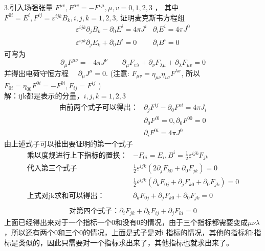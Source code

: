 \documentclass[UTF8]{ctexart}
\begin{document}
3.引入场强张量 $F^{\mu v}, F^{\mu v}=-F^{v \mu}, \mu, v=0,1,2,3$ ，
其中 $F^{0 i}=E^{i}, F^{i j}=\varepsilon^{i j k} B_{k}, i, j, k=1,2,3$, 证明麦克斯韦方程组
$$
     \begin{array}{ll}
          \varepsilon^{i j k} \partial_{j} B_{k}-\partial_{0} E^{i}=4 \pi J^{i} & \partial_{i} E^{i}=4 \pi J^{0} \\
          \varepsilon^{i j k} \partial_{j} E_{k}+\partial_{0} B^{i}=0           & \partial_{i} B^{i}=0
     \end{array}
$$
可㝍为
$$
     \partial_{\mu}F^{\mu\nu}=-4\pi J^{\nu}\qquad
     \partial_{\mu} F_{v \lambda}+\partial_{\nu} F_{\lambda \mu}+\partial_{\lambda} F_{\mu v}=0
$$
并得出电荷守恒方程 $\quad \partial_{\mu} J^{\mu}=0$.
(注意: $F_{\mu v}=\eta_{\mu \nu} \eta_{v \sigma} F^{\lambda \sigma}$, 所以 $F_{0 i}=\eta_{00} F^{0 i}=-F^{0 i}, F_{i j}=F^{i j}$ )\\
解：ijk都是表示的分量，$i,j,k=1,2,3$
\begin{align*}
     \text{由前两个式子可以得出：} & \partial_{j}F^{ij}-\partial_0 F^{oi}=4\pi J_i \\
                                   & \partial_0F^{i0}=0,\partial_0F^{00}=0         \\
                                   & \partial_i F^{0i}=4\pi J^0
\end{align*}
由上述式子可以推出要证明的第一个式子
\begin{align*}
     \text{乘以度规进行上下指标的置换：} & -F_{0i}=E_i,B^{i}=\frac{1}{2}\varepsilon^{ijk}F_{jk}                               \\
     \text{代入第三个式子}               & \frac{1}{2}\varepsilon^{ijk}(2\partial_{j}F_{k0}+\partial_0F_{jk})=0               \\
                                         & \frac{1}{2}\varepsilon^{ijk}(\partial_kF_{0j}+\partial_jF_{k0}+\partial_0F_{jk})=0 \\
     \text{上式对jk求和可以得出：}       & \partial_kF_{0j}+\partial_jF_{k0}+\partial_0F_{jk}=0                               \\
\end{align*}
\begin{align}
     \text{对第四个式子：}\partial_iF_{jk}+\partial_kF_{ij}+\partial_jF_{ki}=0
\end{align}
上面已经得出来对于一个指标一个0和没有0的情况，由于三个指标都需要变成$\mu\nu\lambda$，所以还有两个0和三个0的情况，上面是式子是对i
指标的情况，其他的指标和i指标是类似的，因此只需要对一个指标求出来了，其他指标也就求出来了。\\
\end{document}
